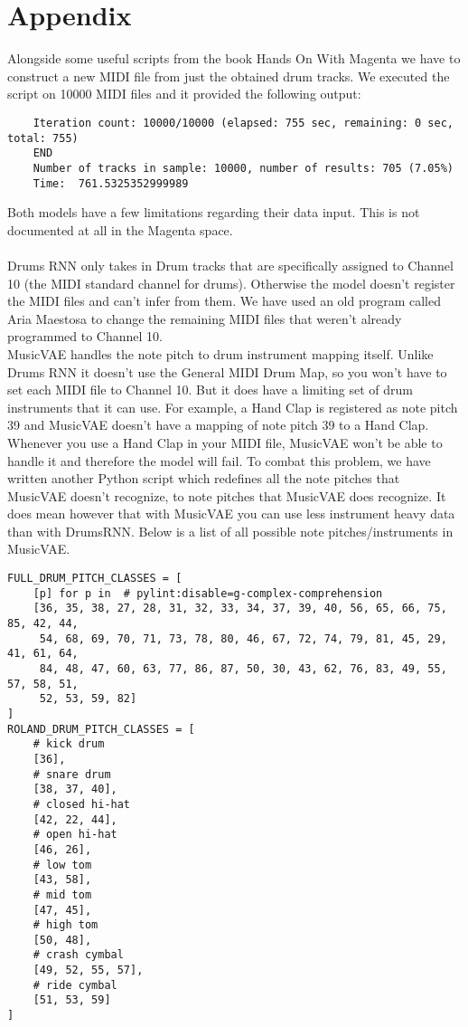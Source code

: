 \section{Appendix}\label{appendix}
Alongside some useful scripts from the book Hands On With Magenta \cite{handson} we have to construct a new MIDI file from just the obtained drum tracks. We executed the script on 10000 MIDI files and it provided the following output:
\begin{verbatim}
    Iteration count: 10000/10000 (elapsed: 755 sec, remaining: 0 sec, total: 755)
    END
    Number of tracks in sample: 10000, number of results: 705 (7.05%)
    Time:  761.5325352999989

\end{verbatim}
Both models have a few limitations regarding their data input. This is not documented at all in the Magenta space.\\\\
Drums RNN only takes in Drum tracks that are specifically assigned to Channel 10 (the MIDI standard channel for drums). Otherwise the model doesn't register the MIDI files and can't infer from them. We have used an old program called Aria Maestosa to change the remaining MIDI files that weren't already programmed to Channel 10.
\\
MusicVAE handles the note pitch to drum instrument mapping itself. Unlike Drums RNN it doesn't use the General MIDI Drum Map, so you won't have to set each MIDI file to Channel 10. But it does have a limiting set of drum instruments that it can use. For example, a Hand Clap is registered as note pitch 39 and MusicVAE doesn't have a mapping of note pitch 39 to a Hand Clap. Whenever you use a Hand Clap in your MIDI file, MusicVAE won't be able to handle it and therefore the model will fail.
To combat this problem, we have written another Python script which redefines all the note pitches that MusicVAE doesn't recognize, to note pitches that MusicVAE does recognize. It does mean however that with MusicVAE you can use less instrument heavy data than with DrumsRNN. Below is a list of all possible note pitches/instruments in MusicVAE.
\begin{verbatim}
FULL_DRUM_PITCH_CLASSES = [
    [p] for p in  # pylint:disable=g-complex-comprehension
    [36, 35, 38, 27, 28, 31, 32, 33, 34, 37, 39, 40, 56, 65, 66, 75, 85, 42, 44,
     54, 68, 69, 70, 71, 73, 78, 80, 46, 67, 72, 74, 79, 81, 45, 29, 41, 61, 64,
     84, 48, 47, 60, 63, 77, 86, 87, 50, 30, 43, 62, 76, 83, 49, 55, 57, 58, 51,
     52, 53, 59, 82]
]
ROLAND_DRUM_PITCH_CLASSES = [
    # kick drum
    [36],
    # snare drum
    [38, 37, 40],
    # closed hi-hat
    [42, 22, 44],
    # open hi-hat
    [46, 26],
    # low tom
    [43, 58],
    # mid tom
    [47, 45],
    # high tom
    [50, 48],
    # crash cymbal
    [49, 52, 55, 57],
    # ride cymbal
    [51, 53, 59]
]
\end{verbatim}
